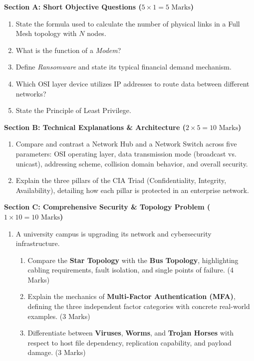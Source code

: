\begin{chaptertest}
\noindent\textbf{Section A: Short Objective Questions ($5 \times 1 = 5\text{ Marks}$)}
\begin{enumerate}[leftmargin=1.5em]
    \item State the formula used to calculate the number of physical links in a Full Mesh topology with $N$ nodes.
    \item What is the function of a \textit{Modem}?
    \item Define \textit{Ransomware} and state its typical financial demand mechanism.
    \item Which OSI layer device utilizes IP addresses to route data between different networks?
    \item State the Principle of Least Privilege.
\end{enumerate}

\medskip
\noindent\textbf{Section B: Technical Explanations \& Architecture ($2 \times 5 = 10\text{ Marks}$)}
\begin{enumerate}[leftmargin=1.5em, start=6]
    \item Compare and contrast a Network Hub and a Network Switch across five parameters: OSI operating layer, data transmission mode (broadcast vs. unicast), addressing scheme, collision domain behavior, and overall security.
    \item Explain the three pillars of the CIA Triad (Confidentiality, Integrity, Availability), detailing how each pillar is protected in an enterprise network.
\end{enumerate}

\medskip
\noindent\textbf{Section C: Comprehensive Security \& Topology Problem ($1 \times 10 = 10\text{ Marks}$)}
\begin{enumerate}[leftmargin=1.5em, start=8]
    \item A university campus is upgrading its network and cybersecurity infrastructure.
    \begin{enumerate}[label=(\alph*)]
        \item Compare the \textbf{Star Topology} with the \textbf{Bus Topology}, highlighting cabling requirements, fault isolation, and single points of failure. (4 Marks)
        \item Explain the mechanics of \textbf{Multi-Factor Authentication (MFA)}, defining the three independent factor categories with concrete real-world examples. (3 Marks)
        \item Differentiate between \textbf{Viruses}, \textbf{Worms}, and \textbf{Trojan Horses} with respect to host file dependency, replication capability, and payload damage. (3 Marks)
    \end{enumerate}
\end{enumerate}
\end{chaptertest}

